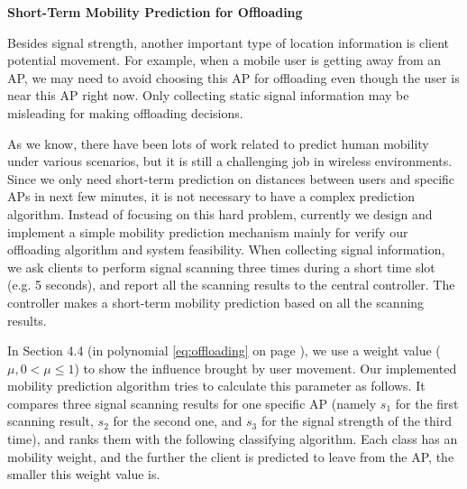 \documentclass[english]{tktltiki}
\begin{document}
\textbf{Short-Term Mobility Prediction for Offloading}

\vspace{1mm}


Besides signal strength, another important type of location information is client potential movement. For example, when a mobile user is getting away from an AP, we may need to avoid choosing this AP for offloading even though the user is near this AP right now. Only collecting static signal information may be misleading for making offloading decisions.

As we know, there have been lots of work related to predict human mobility under various scenarios, but it is still a challenging job in wireless environments. Since we only need short-term prediction on distances between users and specific APs in next few minutes, it is not necessary to have a complex prediction algorithm. Instead of focusing on this hard problem, currently we design and implement a simple mobility prediction mechanism mainly for verify our offloading algorithm and system feasibility. When collecting signal information, we ask clients to perform signal scanning three times during a short time slot (e.g. 5 seconds), and report all the scanning results to the central controller. The controller makes a short-term mobility prediction based on all the scanning results. 

In Section 4.4 (in polynomial \ref{eq:offloading} on page \pageref{eq:offloading}), we use a weight value ($\mu, 0<\mu\leq 1$) to show the influence brought by user movement. Our implemented mobility prediction algorithm tries to calculate this parameter as follows. It compares three signal scanning results for one specific AP (namely $s_1$ for the first scanning result, $s_2$ for the second one, and $s_3$ for the signal strength of the third time), and ranks them with the following classifying algorithm. Each class has an mobility weight, and the further the client is predicted to leave from the AP, the smaller this weight value is.
\end{document}
